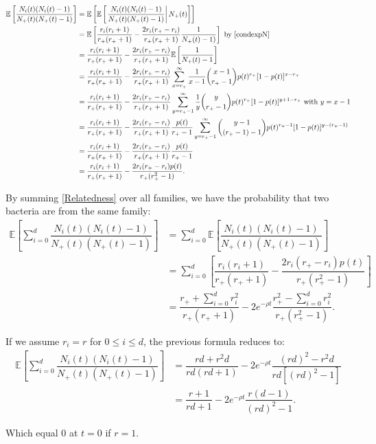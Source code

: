 \documentclass{article}
\begin{document}
\begin{align}
\mathbb{E}\left[ \dfrac{N_i(t)(N_i(t)-1)}{N_+(t) ( N_+(t)-1 )} \right] &= 
 \mathbb{E}\left[ \mathbb{E}\left[ \left. \dfrac{N_i(t)(N_i(t)-1)}{N_+(t)( N_+(t)-1 ) } \right\vert N_+(t) \right] \right]\\
 &=\mathbb{E}\left[\dfrac{r_i(r_i+1)}{r_+ (r_+ +1)}- \dfrac{2 r_i (r_+ -r_{i})}{r_+ (r_+ +1)} \dfrac{1}{N_+(t)-1) } \right] \text{ by \eqref{condexpN}}\\
 &=\dfrac{r_i(r_i+1)}{r_+ (r_+ +1 )}-\dfrac{2 r_i (r_+ -r_{i})}{r_+ (r_+ +1 )}\mathbb{E}\left[\dfrac{1}{N_+(t)-1} \right]\\
 &=\dfrac{r_i(r_i+1)}{r_+ (r_+ +1 )}-\dfrac{2 r_i (r_+ -r_{i})}{r_+ (r_+ +1 )} \sum_{x=r_+}^{\infty } \dfrac{1}{x-1} \binom{x-1}{r_+-1} p(t)^{r_+} [1-p(t)]^{x-r_+} \\
 &=\dfrac{r_i(r_i+1)}{r_+ (r_+ +1 )}-\dfrac{2 r_i (r_+ -r_{i})}{r_+ (r_+ +1 )}\sum_{y=r_+-1}^{\infty} \dfrac{1}{y} \binom{y}{r_+-1} p(t)^{r_+} [1-p(t)]^{y+1-r_+} \text{ with }y=x-1\\
 &=\dfrac{r_i(r_i+1)}{r_+ (r_+ +1 )}-\dfrac{2 r_i (r_+ -r_{i})}{r_+ (r_+ +1 )}\dfrac{p(t)}{r_+-1}\sum_{y=r_+-1}^{\infty}\binom{y-1}{(r_+-1)-1} p(t)^{r_+-1} [1-p(t)]^{y-(r_+-1)} \\
 &=\dfrac{r_i(r_i+1)}{r_+ (r_+ +1 )}-\dfrac{2 r_i (r_+ -r_{i})}{r_+ (r_+ +1 )}\dfrac{p(t)}{r_+-1}\\
 &=\dfrac{r_i(r_i+1)}{r_+ (r_+ +1 )}-\dfrac{2 r_i (r_+ -r_{i})p(t)}{r_+ (r_+^2 -1 )}. \label{Relatedness}
\end{align}

By summing \eqref{Relatedness} over all families, we have the probability that two bacteria are from the same family:
\begin{align}
\mathbb{E}\left[ \displaystyle \sum_{i=0}^d \dfrac{N_i(t)(N_i(t)-1)}{N_+(t)(N_+(t)-1)} \right] &= \displaystyle \sum_{i=0}^d \mathbb{E}\left[  \dfrac{N_i(t)(N_i(t)-1)}{N_+(t)( N_+(t)-1 ) } \right]\\
&= \displaystyle \sum_{i=0}^d \left[ \dfrac{r_i(r_i+1)}{r_+ (r_+ +1 )}-\dfrac{2 r_i (r_+ -r_{i})p(t)}{r_+ (r_+^2 -1 )} \right] \\
&=    \dfrac{ r_+ + \sum_{i=0}^d r_i^2}{r_+ (r_+ +1)}  -2 e^{-\rho t} \dfrac{ r_+^2-\sum_{i=0}^d r_i^2}{r_+ (r_+^2 -1) }.
\end{align}

If we assume $r_i=r$ for $0 \leq i \leq d$, the previous formula reduces to:
\begin{align}
\mathbb{E}\left[ \displaystyle \sum_{i=0}^d \dfrac{N_i(t)(N_i(t)-1)}{N_+(t)\left(N_+(t)-1 \right)} \right] &=
 \dfrac{ rd + r^2 d}{rd (rd +1)}  -2 e^{-\rho t} \dfrac{ (rd)^2-r^2d}{rd [(rd)^2 -1] }\\
 &= \dfrac{r+1}{rd+1}  -2e^{-\rho t} \dfrac{r(d-1)}{(rd)^2 -1 }.
\end{align}

Which equal $0$ at $t=0$ if $r=1$.
\end{document}

